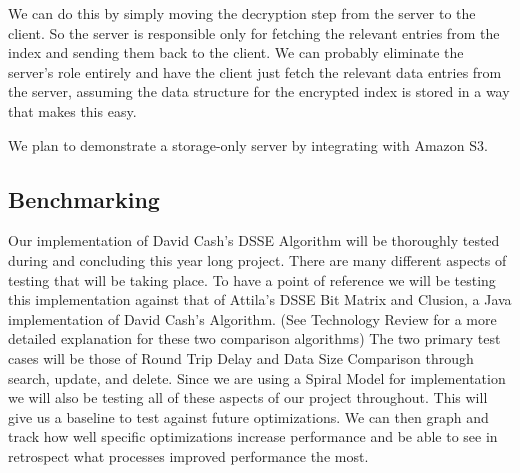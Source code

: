 \documentclass[onecolumn, draftclsnofoot,10pt, compsoc]{IEEEtran}
\begin{document}
We can do this by simply moving the decryption step from the server to the client. So the server is responsible only for fetching the relevant entries from the index and sending them back to the client.
We can probably eliminate the server's role entirely and have the client just fetch the relevant data entries from the server, assuming the data structure for the encrypted index is stored in a way that makes this easy.

We plan to demonstrate a storage-only server by integrating with Amazon S3.

\subsection{ Benchmarking }
\label{subsec:benchmark}


Our implementation of David Cash’s DSSE Algorithm will be thoroughly tested during and concluding this year long project. There are many different aspects of testing that will be taking place. To have a point of reference we will be testing this implementation against that of Attila’s DSSE Bit Matrix and Clusion, a Java implementation of David Cash’s Algorithm. (See Technology Review for a more detailed explanation for these two comparison algorithms) The two primary test cases will be those of Round Trip Delay and Data Size Comparison through search, update, and delete.
Since we are using a Spiral Model for implementation we will also be testing all of these aspects of our project throughout. This will give us a baseline to test against future optimizations. We can then graph and track how well specific optimizations increase performance and be able to see in retrospect what processes improved performance the most.
\end{document}
